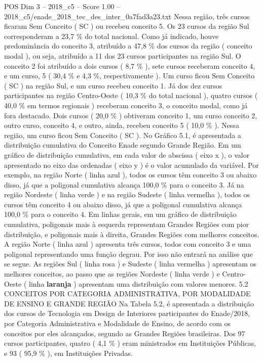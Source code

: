 \begin{textsample}{POS Dim 3 – 2018\_c5 – Score 1.00 – 2018\_c5/enade\_2018\_tec\_des\_inter\_0a7fad3a23.txt}
Nessa região, três cursos ficaram Sem Conceito ( SC ) ou recebeu conceito 5.
Os 23 cursos da região Sul corresponderam a 23,7 \% do total nacional.
Como já indicado, houve predominância do conceito 3, atribuído a 47,8 \% dos cursos da região ( conceito modal ), ou seja, atribuído a 11 dos 23 cursos participantes na região Sul.
O conceito 2 foi atribuído a dois cursos ( 8,7 \% ), sete cursos receberam conceito 4, e um curso, 5 ( 30,4 \% e 4,3 \%, respectivamente ).
Um curso ficou Sem Conceito ( SC ) na região Sul, e um curso recebeu conceito 1.
Já dos dez cursos participantes na região Centro-Oeste ( 10,3 \% do total nacional ), quatro cursos ( 40,0 \% em termos regionais ) receberam conceito 3, o conceito modal, como já fora destacado.
Dois cursos ( 20,0 \% ) obtiveram conceito 1, um curso conceito 2, outro curso, conceito 4, e outro, ainda, recebeu conceito 5 ( 10,0 \% ).
Nessa região, um curso ficou Sem Conceito ( SC ).
No Gráfico 5.1, é apresentada a distribuição cumulativa do Conceito Enade segundo Grande Região.
Em um gráfico de distribuição cumulativa, em cada valor de abscissa ( eixo x ), o valor apresentado no eixo das ordenadas ( eixo y ) é o valor acumulado da variável.
Por exemplo, na região Norte ( linha azul ), todos os cursos têm conceito 3 ou abaixo disso, já que a poligonal cumulativa alcança 100,0 \% para o conceito 3.
Já na região Nordeste ( linha verde ) e na região Sudeste ( linha vermelha ), todos os cursos têm conceito 4 ou abaixo disso, já que a poligonal cumulativa alcança 100,0 \% para o conceito 4.
Em linhas gerais, em um gráfico de distribuição cumulativa, poligonais mais à esquerda representam Grandes Regiões com pior distribuição, e poligonais mais à direita, Grandes Regiões com melhores conceitos.
A região Norte ( linha azul ) apresenta três cursos, todos com conceito 3 e uma poligonal representando uma função degrau.
Por isso não entrará na análise que se segue.
As regiões Sul ( linha rosa ) e Sudeste ( linha vermelha ) apresentam os melhores conceitos, ao passo que as regiões Nordeste ( linha verde ) e Centro-Oeste ( linha \textbf{laranja} ) apresentam uma distribuição com valores menores. 5.2 CONCEITOS POR CATEGORIA ADMINISTRATIVA, POR MODALIDADE DE ENSINO E GRANDE REGIÃO Na Tabela 5.2, é apresentada a distribuição dos cursos de Tecnologia em Design de Interiores participantes do Enade/2018, por Categoria Administrativa e Modalidade de Ensino, de acordo com os conceitos por eles alcançados, segundo as Grandes Regiões brasileiras.
Dos 97 cursos participantes, quatro ( 4,1 \% ) eram ministrados em Instituições Públicas, e 93 ( 95,9 \% ), em Instituições Privadas.

\end{textsample}
